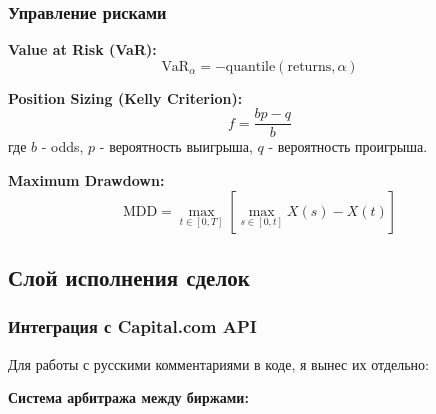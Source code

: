 \documentclass[12pt,a4paper]{article}
\begin{document}
\subsubsection{Управление рисками}
\textbf{Value at Risk (VaR):}
\begin{equation}
\text{VaR}_\alpha = -\text{quantile}(\text{returns}, \alpha)
\end{equation}

\textbf{Position Sizing (Kelly Criterion):}
\begin{equation}
f = \frac{bp - q}{b}
\end{equation}
где $b$ - odds, $p$ - вероятность выигрыша, $q$ - вероятность проигрыша.

\textbf{Maximum Drawdown:}
\begin{equation}
\text{MDD} = \max_{t \in [0,T]} \left[ \max_{s \in [0,t]} X(s) - X(t) \right]
\end{equation}

\subsection{Слой исполнения сделок}

\subsubsection{Интеграция с Capital.com API}

Для работы с русскими комментариями в коде, я вынес их отдельно:

\textbf{Система арбитража между биржами:}

\end{document}
